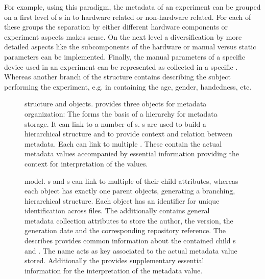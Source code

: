 For example, using this paradigm, the metadata of an experiment can be grouped on a first level of s in to hardware related or non-hardware related. For each of these groups the separation by either different hardware components or experiment aspects makes sense. On the next level a diversification by more detailed aspects like the subcomponents of the hardware or manual versus static parameters can be implemented. Finally, the manual parameters of a specific device used in an experiment can be represented as  collected in a specific . Whereas another branch of the  structure contains  describing the subject performing the experiment, e.g. in  containing the age, gender, handedness, etc.


\begin{figure}
    \centering
    
    \caption[ structure and objects]{ structure and objects.  provides three objects for metadata organization: The   forms the basis of a hierarchy for metadata storage. It can link to a number of  s. s are used to build a hierarchical structure and to provide context and relation between metadata. Each  can link to multiple . These contain the actual metadata values accompanied by essential information providing the context for interpretation of the values.}
    \label{fig:intro_odML_structure}
\end{figure}

\begin{figure}
    \centering
    
    \caption[ model]{ model. s and s can link to multiple of their child attributes, whereas each object has exactly one parent objects, generating a branching, hierarchical structure. Each object has an identifier  for unique identification across files. The  additionally contains general metadata collection attributes to store the author, the version, the generation date and the corresponding repository reference. The  describes provides common information about the contained child s and . The  name acts as key associated to the actual metadata value stored. Additionally the  provides supplementary essential information for the interpretation of the metadata value.}
    \label{fig:intro_odML_model}
\end{figure}

